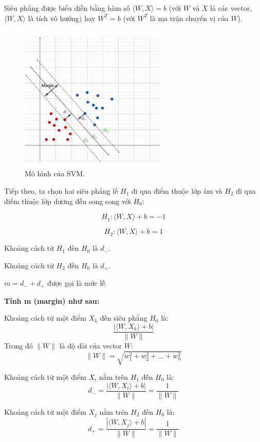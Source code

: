 \documentclass[conference]{IEEEtran}
\begin{document}
 Siêu phẳng được biểu diễn bằng hàm số \( \langle W, X \rangle = b \) (với \( W \) và \( X \) là các vector, \( \langle W, X \rangle \) là tích vô hướng) hay \( W^T = b \) (với \( W^T \) là ma trận chuyển vị của \( W \)).
 \begin{figure}[H] %
    \centering
    \includegraphics[width=7cm, height=7cm]{Images/Margin.png} %
    \caption{Mô hình của SVM.}
    \label{fig:arima-model}
\end{figure}
Tiếp theo, ta chọn hai siêu phẳng lề \( H_1 \) đi qua điểm thuộc lớp âm và \( H_2 \) đi qua điểm thuộc lớp dương đều song song với \( H_0 \):

\[
H_1: \langle W, X \rangle + b = -1
\]

\[
H_2: \langle W, X \rangle + b = 1
\]

Khoảng cách từ \( H_1 \) đến \( H_0 \) là \( d_- \).

Khoảng cách từ \( H_2 \) đến \( H_0 \) là \( d_+ \).

\( m = d_- + d_+ \) được gọi là mức lề.


\textbf{Tính m (margin) như sau:}

Khoảng cách từ một điểm \( X_{k} \) đến siêu phẳng \( H_{0} \) là:
\[
\frac{| \langle W, X_{k} \rangle + b |}{\| W \|} 
\]
Trong đó \( \| W \| \) là độ dài của vector \( W \):
\[
\| W \| = \sqrt{w_{1}^{2} + w_{2}^{2} + \ldots + w_{n}^{2}}
\]

Khoảng cách từ một điểm \( X_{i} \) nằm trên \( H_{1} \) đến \( H_{0} \) là:
\[
d_{-} = \frac{| \langle W, X_{i} \rangle + b |}{\| W \|} = \frac{1}{\| W \|}
\]

Khoảng cách từ một điểm \( X_{j} \) nằm trên \( H_{2} \) đến \( H_{0} \) là:
\[
d_{+} = \frac{| \langle W, X_{j} \rangle + b |}{\| W \|} = \frac{1}{\| W \|}
\]
\end{document}

